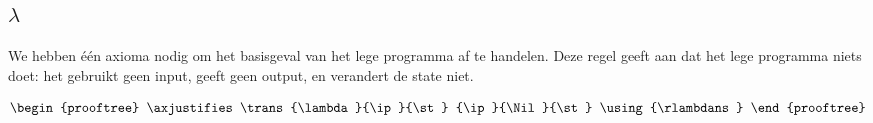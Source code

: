 \subsection{$\lambda$}

We hebben één axioma nodig om het basisgeval van het lege programma af te
handelen. Deze regel geeft aan dat het lege programma niets doet: het gebruikt
geen input, geeft geen output, en verandert de state niet.

$$
\begin{prooftree}
	\axjustifies
	\trans
		{\lambda}{\ip}{\st}
		{\ip}{\Nil}{\st}
	\using{\rlambdans}
\end{prooftree}
$$

